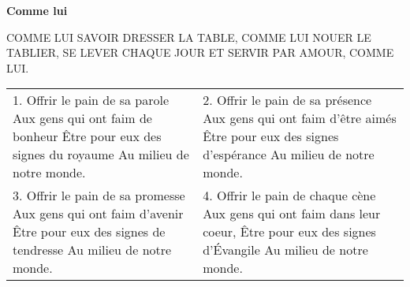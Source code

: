 \textbf{Comme lui}

COMME LUI SAVOIR DRESSER LA TABLE,
COMME LUI NOUER LE TABLIER,
SE LEVER CHAQUE JOUR
ET SERVIR PAR AMOUR, COMME LUI.

\begin{tabular}{p{} p{}}
1.
Offrir le pain de sa parole \newline
Aux gens qui ont faim de bonheur \newline
Être pour eux des signes du royaume \newline
Au milieu de notre monde.
&
2.
Offrir le pain de sa présence \newline
Aux gens qui ont faim d’être aimés \newline
Être pour eux des signes d’espérance \newline
Au milieu de notre monde.
\\
3.
Offrir le pain de sa promesse \newline
Aux gens qui ont faim d’avenir \newline
Être pour eux des signes de tendresse \newline
Au milieu de notre monde.
&
4.
Offrir le pain de chaque cène \newline
Aux gens qui ont faim dans leur coeur, \newline
Être pour eux des signes d’Évangile \newline
Au milieu de notre monde.
\end{tabular}
